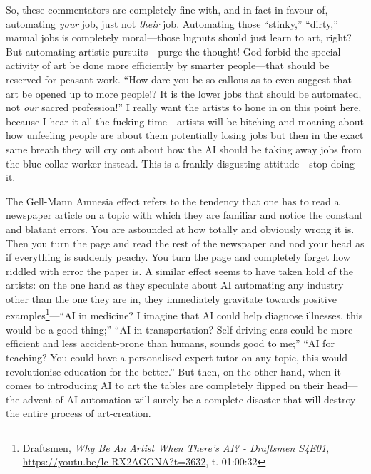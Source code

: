\documentclass[11pt]{article}
\begin{document}
So, these commentators are completely fine with, and in fact in favour of, automating \emph{your} job, just not \emph{their} job. Automating those ``stinky,'' ``dirty,'' manual jobs is completely moral---those lugnuts should just learn to art, right? But automating artistic pursuits---purge the thought! God forbid the special activity of art be done more efficiently by smarter people---that should be reserved for peasant-work. ``How dare you be so callous as to even suggest that art be opened up to more people!? It is the lower jobs that should be automated, not \emph{our} sacred profession!'' I really want the artists to hone in on this point here, because I hear it all the fucking time---artists will be bitching and moaning about how unfeeling people are about them potentially losing jobs but then in the exact same breath they will cry out about how the AI should be taking away jobs from the blue-collar worker instead. This is a frankly disgusting attitude---stop doing it.

The Gell-Mann Amnesia effect refers to the tendency that one has to read a newspaper article on a topic with which they are familiar and notice the constant and blatant errors. You are astounded at how totally and obviously wrong it is. Then you turn the page and read the rest of the newspaper and nod your head as if everything is suddenly peachy. You turn the page and completely forget how riddled with error the paper is. A similar effect seems to have taken hold of the artists: on the one hand as they speculate about AI automating any industry other than the one they are in, they immediately gravitate towards positive examples\footnote{Draftsmen, \emph{Why Be An Artist When There's AI? - Draftsmen S4E01}, \url{https://youtu.be/lc-RX2AGGNA?t=3632}, t. 01:00:32}---``AI in medicine? I imagine that AI could help diagnose illnesses, this would be a good thing;'' ``AI in transportation? Self-driving cars could be more efficient and less accident-prone than humans, sounds good to me;'' ``AI for teaching? You could have a personalised expert tutor on any topic, this would revolutionise education for the better.'' But then, on the other hand, when it comes to introducing AI to art the tables are completely flipped on their head---the advent of AI automation will surely be a complete disaster that will destroy the entire process of art-creation.
\end{document}
